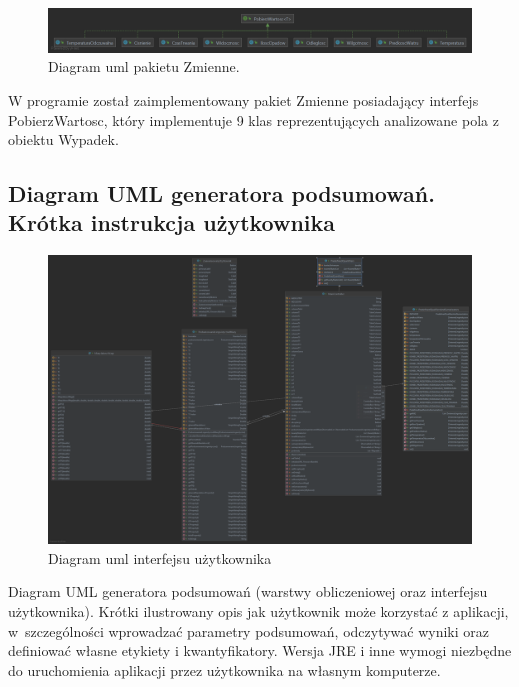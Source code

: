 \documentclass{classrep}
\begin{document}
\begin{figure}[h!]
 \centering
 \includegraphics[width=14cm]{uml_2.png}
 \vspace{-0.3cm}
 \caption{Diagram uml pakietu Zmienne. }
 \label{uml_zmienne}
\end{figure}


W programie został zaimplementowany pakiet Zmienne posiadający interfejs PobierzWartosc, który implementuje 9 klas reprezentujących analizowane pola z obiektu Wypadek. 

\newpage

\subsection{Diagram UML generatora podsumowań. Krótka instrukcja użytkownika} 


\begin{figure}[h!]
 \centering
 \includegraphics[width=15cm]{uml_3.png}
 \vspace{-0.3cm}
 \caption{Diagram uml interfejsu użytkownika }
 \label{uml_gui}
\end{figure}

\newpage


Diagram UML generatora podsumowań (warstwy obliczeniowej oraz interfejsu
użytkownika). Krótki ilustrowany opis jak użytkownik może korzystać z aplikacji, w~szczególności
wprowadzać parametry  podsumowań, odczytywać wyniki oraz definiować własne etykiety i
kwantyfikatory. Wersja JRE i inne wymogi niezbędne do uruchomienia aplikacji przez użytkownika na własnym komputerze. \\
\end{document}
